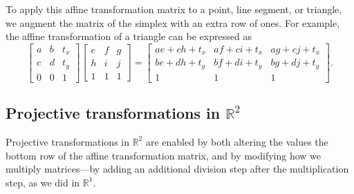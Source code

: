 To apply this affine transformation matrix to a point, line segment,
or triangle, we augment the matrix of the simplex with an extra 
row of ones. For example, the affine transformation of a triangle 
can be expressed as
\[
    \begin{bmatrix}
        a & b & t_{x} \\
        c & d & t_{y} \\
        0 & 0 & 1
    \end{bmatrix}
    \begin{bmatrix}
        e & f & g \\
        h & i & j \\
        1 & 1 & 1
    \end{bmatrix}
    =
    \begin{bmatrix}
        ae+ch+t_{x} & af+ci+t_{x} & ag+cj+t_{x} \\
        be+dh+t_{y} & bf+di+t_{y} & bg+dj+t_{y} \\
        1 & 1 & 1
    \end{bmatrix}.
\]

\subsection{Projective transformations in \texorpdfstring{\(\mathbb{R}^{2}\)}{R2}}

Projective transformations in \(\mathbb{R}^{2}\) are enabled by both
altering the values the bottom row of the affine transformation matrix,
and by modifying how we multiply matrices---by adding an additional
division step after the multiplication step, as we did in \(\mathbb{R}^{1}\).

